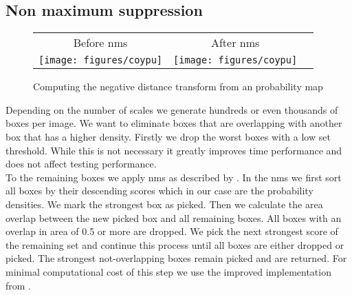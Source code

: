 \subsection{Non maximum suppression}
\label{sec:pipeline:eval:nms}
\begin{figure}[htb]
    \begin{tabular}{ccc}
        Before \gls{nms} & After \gls{nms} \\[3pt]
        \texttt{[image: figures/coypu]} &
        \texttt{[image: figures/coypu]}
    \end{tabular}
	\caption{Computing the negative distance transform from an probability map}
    \label{fig:distance_transform}
\end{figure}
Depending on the number of scales we generate hundreds or even thousands of boxes per image. We want to eliminate boxes that are overlapping with another box that has a higher density. Firstly we drop the worst boxes with a low set threshold. While this is not necessary it greatly improves time performance and does not affect testing performance.\\To the remaining boxes we apply \gls{nms} as described by \citet{felzenszwalb_discriminatively_2008}. In the \gls{nms} we first sort all boxes by their descending scores which in our case are the probability densities. We mark the strongest box as picked. Then we calculate the area overlap between the new picked box and all remaining boxes. All boxes with an overlap in area of 0.5 or more are dropped. We pick the next strongest score of the remaining set and continue this process until all boxes are either dropped or picked. The strongest not-overlapping boxes remain picked and are returned. For minimal computational cost of this step we use the improved implementation from \citet{malisiewicz_ensemble_2011}.
